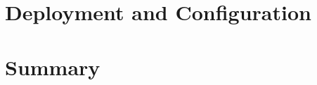 

\section{Deployment and Configuration}
\label{sec:deployment}



\section{Summary}
\label{sec:impl-summary}

